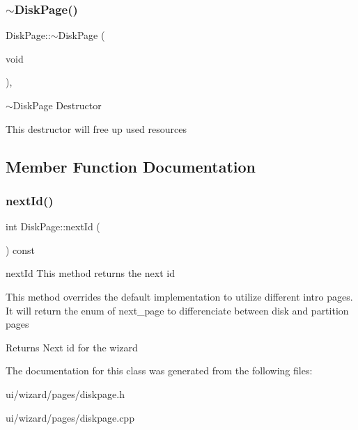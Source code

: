 \subsubsection{\texorpdfstring{$\sim$\+Disk\+Page()}{~DiskPage()}}
{\footnotesize\ttfamily Disk\+Page\+::$\sim$\+Disk\+Page (\begin{DoxyParamCaption}\item[{void}]{ }\end{DoxyParamCaption})\hspace{0.3cm}{\ttfamily [override]}, {\ttfamily [virtual]}}



$\sim$\+Disk\+Page Destructor 

This destructor will free up used resources 

\subsection{Member Function Documentation}
\mbox{\label{classui_1_1wizard_1_1pages_1_1_disk_page_ac6cb9ab53d89deac235d43251b333354}} 
\subsubsection{\texorpdfstring{next\+Id()}{nextId()}}
{\footnotesize\ttfamily int Disk\+Page\+::next\+Id (\begin{DoxyParamCaption}{ }\end{DoxyParamCaption}) const\hspace{0.3cm}{\ttfamily [override]}}



next\+Id This method returns the next id 

This method overrides the default implementation to utilize different intro pages. It will return the enum of next\+\_\+page to differenciate between disk and partition pages \begin{DoxyReturn}{Returns}
Next id for the wizard 
\end{DoxyReturn}


The documentation for this class was generated from the following files\+:\begin{DoxyCompactItemize}
\item 
ui/wizard/pages/diskpage.\+h\item 
ui/wizard/pages/diskpage.\+cpp\end{DoxyCompactItemize}
